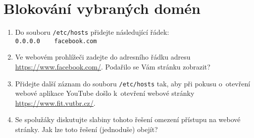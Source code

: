 \section{Blokování vybraných domén}
\begin{enumerate}
	\item Do souboru \texttt{/etc/hosts} přidejte následující řádek:\\
    \verb|0.0.0.0    facebook.com|
    \item Ve webovém prohlížeči zadejte do adresního řádku adresu \url{https://www.facebook.com/}. Podařilo se Vám stránku zobrazit?
    \item Přidejte další záznam do souboru \texttt{/etc/hosts} tak, aby při pokusu o~otevření webové aplikace YouTube došlo k~otevření webové stránky \url{https://www.fit.vutbr.cz/}.
    \item Se spolužáky diskutujte slabiny tohoto řešení omezení přístupu na webové stránky. Jak lze toto řešení (jednoduše) obejít?
\end{enumerate}


